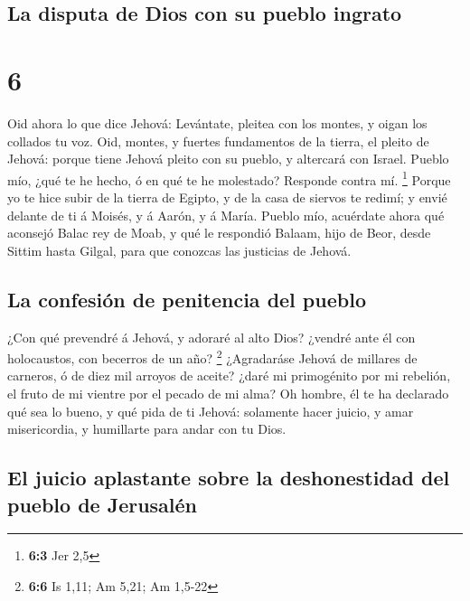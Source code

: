 \hypertarget{la-disputa-de-dios-con-su-pueblo-ingrato}{%
\subsection{La disputa de Dios con su pueblo
ingrato}\label{la-disputa-de-dios-con-su-pueblo-ingrato}}

\hypertarget{section-5}{%
\section{6}\label{section-5}}

 Oid ahora lo que dice Jehová: Levántate, pleitea con los
montes, y oigan los collados tu voz.  Oid, montes, y fuertes
fundamentos de la tierra, el pleito de Jehová: porque tiene Jehová
pleito con su pueblo, y altercará con Israel.  Pueblo mío,
¿qué te he hecho, ó en qué te he molestado? Responde contra mí.
\footnote{\textbf{6:3} Jer 2,5}  Porque yo te hice subir de
la tierra de Egipto, y de la casa de siervos te redimí; y envié delante
de ti á Moisés, y á Aarón, y á María.  Pueblo mío, acuérdate
ahora qué aconsejó Balac rey de Moab, y qué le respondió Balaam, hijo de
Beor, desde Sittim hasta Gilgal, para que conozcas las justicias de
Jehová.

\hypertarget{la-confesiuxf3n-de-penitencia-del-pueblo}{%
\subsection{La confesión de penitencia del
pueblo}\label{la-confesiuxf3n-de-penitencia-del-pueblo}}

 ¿Con qué prevendré á Jehová, y adoraré al alto Dios?
¿vendré ante él con holocaustos, con becerros de un año? \footnote{\textbf{6:6}
  Is 1,11; Am 5,21; Am 1,5-22}  ¿Agradaráse Jehová de
millares de carneros, ó de diez mil arroyos de aceite? ¿daré mi
primogénito por mi rebelión, el fruto de mi vientre por el pecado de mi
alma?  Oh hombre, él te ha declarado qué sea lo bueno, y qué
pida de ti Jehová: solamente hacer juicio, y amar misericordia, y
humillarte para andar con tu Dios.

\hypertarget{el-juicio-aplastante-sobre-la-deshonestidad-del-pueblo-de-jerusaluxe9n}{%
\subsection{El juicio aplastante sobre la deshonestidad del pueblo de
Jerusalén}\label{el-juicio-aplastante-sobre-la-deshonestidad-del-pueblo-de-jerusaluxe9n}}

